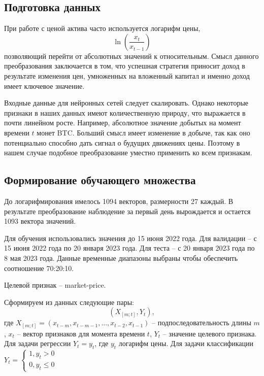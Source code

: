 \documentclass[diploma]{nanolab2015}
\begin{document}
\subsection{Подготовка данных}
При работе с ценой актива часто используется логарифм цены,
$$
    \ln(\frac{x_{t}}{x_{t-1}})
$$
позволяющий перейти от абсолютных значений к относительным. Смысл данного преобразования заключается в том, что успешная стратегия приносит доход в результате изменения цен, умноженных на вложенный капитал и именно доход имеет ключевое значение.

Входные данные для нейронных сетей следует скалировать. Однако некоторые признаки в наших данных имеют количественную природу, что выражается в почти линейном росте. Например, абсолютное значение добытых на момент времени $t$ монет BTC. Больший смысл имеет изменение в добыче, так как оно потенциально способно дать сигнал о будущих движениях цены. Поэтому в нашем случае подобное преобразование уместно применить ко всем признакам.

\subsection{Формирование обучающего множества}
До логарифмирования имелось 1094 векторов, размерности 27 каждый. В результате преобразование наблюдение за первый день вырождается и остается 1093 вектора значений.

Для обучения использовались значения до 15 июня 2022 года. Для валидации -- с 15 июня 2022 года по 20 января 2023 года. Для теста -- с 20 января 2023 года по 8 мая 2023 года. Данные временные диапазоны выбраны чтобы обеспечить соотношение 70:20:10.

Целевой признак -- market-price.

Сформируем из данных следующие пары:
$$
    (X_{[m;t]}, Y_{t}),
$$
где $X_{[m;t]} = (x_{t-m}, x_{t-m-1}, ... , x_{t-2}, x_{t-1})$ -- подпоследовательность длины $m$, $x_t$ -- вектор признаков для момента времени $t$, $Y_t$ -- значение целевого признака.
Для задачи регрессии $Y_t = y_t$, где $y_t$ логарифм цены. Для задачи классификации
$
    Y_t =
    \begin{cases}
        1, y_t > 0 \\
        0, y_t \le 0
    \end{cases}
$

\renewcommand\theadalign{ll}
\end{document}
